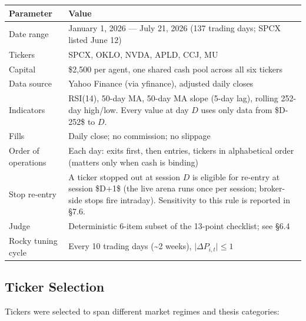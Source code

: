 \documentclass[11pt]{article}
\begin{document}
{\def\LTcaptype{none} %
{\small
\begin{longtable}{@{}
  >{\raggedright\arraybackslash}p{}
  >{\raggedright\arraybackslash}p{}@{}}
\toprule\noalign{}
\begin{minipage}[b]{\linewidth}\raggedright
Parameter
\end{minipage} & \begin{minipage}[b]{\linewidth}\raggedright
Value
\end{minipage} \\
\midrule\noalign{}
\endhead
\bottomrule\noalign{}
\endlastfoot
\renewcommand{\arraystretch}{1.15}
Date range & January 1, 2026 --- July 21, 2026 (137 trading days; SPCX listed June 12) \\
Tickers & SPCX, OKLO, NVDA, APLD, CCJ, MU \\
Capital & \$2,500 per agent, one shared cash pool across all six tickers \\
Data source & Yahoo Finance (via yfinance), adjusted daily closes \\
Indicators & RSI(14), 50-day MA, 50-day MA slope (5-day lag), rolling 252-day high/low. Every value at day \(D\) uses only data from \$D-252\$ to \(D\). \\
Fills & Daily close; no commission; no slippage \\
Order of operations & Each day: exits first, then entries, tickers in alphabetical order (matters only when cash is binding) \\
Stop re-entry & A ticker stopped out at session \(D\) is eligible for re-entry at session \$D+1\$ (the live arena runs once per session; broker-side stops fire intraday). Sensitivity to this rule is reported in §7.6. \\
Judge & Deterministic 6-item subset of the 13-point checklist; see §6.4 \\
Rocky tuning cycle & Every 10 trading days (\textasciitilde2 weeks), \(\lvert \Delta P_{i,t} \rvert \leq 1\) \\
\end{longtable}}
}

\subsection{Ticker Selection}\label{ticker-selection}

Tickers were selected to span different market regimes and thesis categories:
\end{document}
